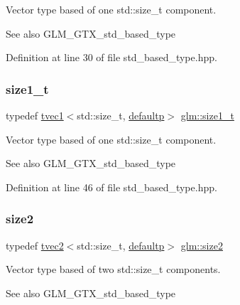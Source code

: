 Vector type based of one std\+::size\+\_\+t component. \begin{DoxySeeAlso}{See also}
G\+L\+M\+\_\+\+G\+T\+X\+\_\+std\+\_\+based\+\_\+type 
\end{DoxySeeAlso}


Definition at line 30 of file std\+\_\+based\+\_\+type.\+hpp.

\mbox{\label{group__gtx__std__based__type_ga9a9525491009d0df7bcc964b1e2e5745}} 
\subsubsection{\texorpdfstring{size1\_t}{size1\_t}}
{\footnotesize\ttfamily typedef \mbox{\hyperlink{structglm_1_1tvec1}{tvec1}}$<$std\+::size\+\_\+t, \mbox{\hyperlink{namespaceglm_a0f04f086094c747d227af4425893f545a9d21ccd8b5a009ec7eb7677befc3bf51}{defaultp}}$>$ \mbox{\hyperlink{group__gtx__std__based__type_ga9a9525491009d0df7bcc964b1e2e5745}{glm\+::size1\+\_\+t}}}

Vector type based of one std\+::size\+\_\+t component. \begin{DoxySeeAlso}{See also}
G\+L\+M\+\_\+\+G\+T\+X\+\_\+std\+\_\+based\+\_\+type 
\end{DoxySeeAlso}


Definition at line 46 of file std\+\_\+based\+\_\+type.\+hpp.

\mbox{\label{group__gtx__std__based__type_gab8b434ee2ba109726915e977c6aca22a}} 
\subsubsection{\texorpdfstring{size2}{size2}}
{\footnotesize\ttfamily typedef \mbox{\hyperlink{structglm_1_1tvec2}{tvec2}}$<$std\+::size\+\_\+t, \mbox{\hyperlink{namespaceglm_a0f04f086094c747d227af4425893f545a9d21ccd8b5a009ec7eb7677befc3bf51}{defaultp}}$>$ \mbox{\hyperlink{group__gtx__std__based__type_gab8b434ee2ba109726915e977c6aca22a}{glm\+::size2}}}

Vector type based of two std\+::size\+\_\+t components. \begin{DoxySeeAlso}{See also}
G\+L\+M\+\_\+\+G\+T\+X\+\_\+std\+\_\+based\+\_\+type 
\end{DoxySeeAlso}


